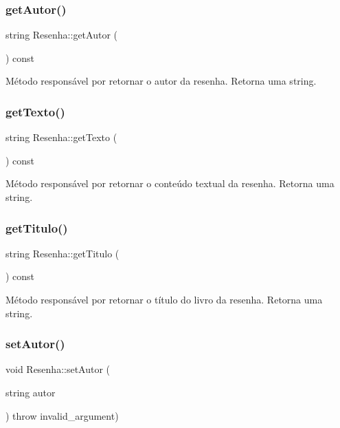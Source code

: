\subsubsection{\texorpdfstring{get\+Autor()}{getAutor()}}
{\footnotesize\ttfamily string Resenha\+::get\+Autor (\begin{DoxyParamCaption}{ }\end{DoxyParamCaption}) const\hspace{0.3cm}{\ttfamily [inline]}}

Método responsável por retornar o autor da resenha. Retorna uma string. \mbox{\label{classResenha_a17b193d598f0b50f90310a67afc0b524}} 
\subsubsection{\texorpdfstring{get\+Texto()}{getTexto()}}
{\footnotesize\ttfamily string Resenha\+::get\+Texto (\begin{DoxyParamCaption}{ }\end{DoxyParamCaption}) const\hspace{0.3cm}{\ttfamily [inline]}}

Método responsável por retornar o conteúdo textual da resenha. Retorna uma string. \mbox{\label{classResenha_a8c0966bc51ba8d43c769594446797d9f}} 
\subsubsection{\texorpdfstring{get\+Titulo()}{getTitulo()}}
{\footnotesize\ttfamily string Resenha\+::get\+Titulo (\begin{DoxyParamCaption}{ }\end{DoxyParamCaption}) const\hspace{0.3cm}{\ttfamily [inline]}}

Método responsável por retornar o título do livro da resenha. Retorna uma string. \mbox{\label{classResenha_a93b2d590fce3efecb9d1a2a5c1ab4ef1}} 
\subsubsection{\texorpdfstring{set\+Autor()}{setAutor()}}
{\footnotesize\ttfamily void Resenha\+::set\+Autor (\begin{DoxyParamCaption}\item[{string}]{autor }\end{DoxyParamCaption}) throw  invalid\+\_\+argument) }

